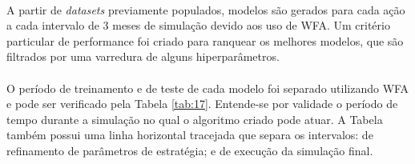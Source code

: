 \paragraph{} A partir de \textit{datasets} previamente populados, modelos são gerados para cada ação a cada intervalo de 3 meses de simulação devido aos uso de WFA. Um critério particular de performance foi criado para ranquear os melhores modelos, que são filtrados por uma varredura de alguns hiperparâmetros.

\paragraph{} O período de treinamento e de teste de cada modelo foi separado utilizando WFA e pode ser verificado pela Tabela \ref{tab:17}. Entende-se por validade o período de tempo durante a simulação no qual o algoritmo criado pode atuar. A Tabela também possui uma linha horizontal tracejada que separa os intervalos: de refinamento de parâmetros de estratégia; e de execução da simulação final.

